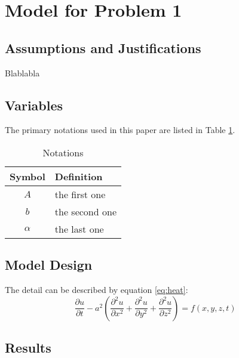 \documentclass[12pt]{article}
\begin{document}
\section{Model for Problem 1}

	\subsection{Assumptions and Justifications}
	
		Blablabla
	
	
	
	\subsection{Variables}
	
		The primary notations used in this paper are listed in Table \ref{tb:notation}.
		
		\begin{table}[!htbp]
		\begin{center}
		\caption{Notations}
		\begin{tabular}{cl}
			\toprule
			\multicolumn{1}{m{3cm}}{\centering Symbol}
			&\multicolumn{1}{m{8cm}}{\centering Definition}\\
			\midrule
			$A$&the first one\\
			$b$&the second one\\
			$\alpha$ &the last one\\
			\bottomrule
		\end{tabular}\label{tb:notation}
		\end{center}
		\end{table}
	
	
	
	\subsection{Model Design}
	
		The detail can be described by equation \eqref{eq:heat}:
		\begin{equation}\label{eq:heat}
		\frac{\partial u}{\partial t} - a^2 \left( \frac{\partial^2 u}{\partial x^2} + \frac{\partial^2 u}{\partial y^2} + 	\frac{\partial^2 u}{\partial z^2} \right) = f(x, y, z, t)
		\end{equation}
	
	
	
	\subsection{Results}
	
\end{document}
